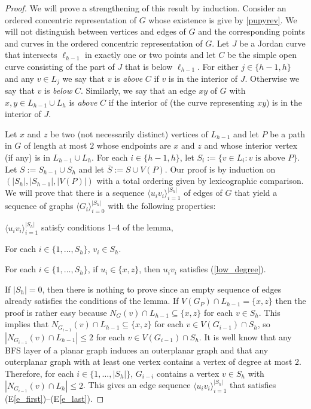 \documentclass{patmorin}
\begin{document}
\begin{proof}
  We will prove a strengthening of this result by induction.  Consider an ordered concentric representation of $G$ whose existence is give by \cref{pupyrev}.  We will not distinguish between vertices and edges of $G$ and the corresponding points and curves in the ordered concentric representation of $G$. Let $J$ be a Jordan curve that intersects $\ell_{h-1}$ in exactly one or two points and let $C$ be the simple open curve consisting of the part of $J$ that is below $\ell_{h-1}$.  For either $j\in\{h-1,h\}$ and any $v\in L_j$ we say that $v$ is \emph{above} $C$ if $v$ is in the interior of $J$. Otherwise we say that $v$ is \emph{below} $C$.  Similarly, we say that an edge $xy$ of $G$ with $x,y\in L_{h-1}\cup L_h$ is \emph{above} $C$ if the interior of (the curve representing $xy$) is in the interior of $J$.

  Let $x$ and $z$ be two (not necessarily distinct) vertices of $L_{h-1}$ and let $P$ be a path in $G$ of length at most $2$ whose endpoints are $x$ and $z$ and whose interior vertex (if any) is in $L_{h-1}\cup L_h$. For each $i\in\{h-1,h\}$, let $S_i:=\{v\in L_i:\mbox{$v$ is above $P$}\}$.  Let $S:=S_{h-1}\cup S_{h}$ and let $\overline{S}:=S\cup V(P)$. Our proof is by induction on $(|S_h|,|S_{h-1}|,|V(P)|)$ with a total ordering given by lexicographic comparison.   We will prove that there is a sequence $\langle u_iv_i\rangle_{i=1}^{|S_h|}$ of edges of $G$ that yield a sequence of graphs $\langle G_i\rangle_{i=0}^{|S_h|}$ with the following properties:
  \begin{compactenum}[(E1)]
    \item \label{e_first}\label{original_conditions} $\langle u_iv_i\rangle_{i=1}^{|S_h|}$ satisfy conditions 1--4 of the lemma,
    \item For each $i\in\{1,\ldots,S_h\}$, $v_i\in S_h$.
    \item \label{e_last} For each $i\in\{1,\ldots,S_h\}$, if $u_i\in\{x,z\}$, then $u_iv_i$ satisfies (\ref{low_degree}).
  \end{compactenum}


  If $|S_h|=0$, then there is nothing to prove since an empty sequence of edges already satisfies the conditions of the lemma.  If $V(G_P)\cap L_{h-1}=\{x,z\}$ then the proof is rather easy because $N_G(v)\cap L_{h-1}\subseteq \{x,z\}$ for each $v\in S_h$.  This implies that $N_{G_{i-1}}(v)\cap L_{h-1}\subseteq\{x,z\}$ for each $v\in V(G_{i-1})\cap S_h$, so $|N_{G_{i-1}}(v)\cap L_{h-1}|\le 2$ for each $v\in V(G_{i-1})\cap S_h$.  It is well know that any BFS layer of a planar graph induces an outerplanar graph and that any outerplanar graph with at least one vertex contains a vertex of degree at most $2$.  Therefore, for each $i\in\{1,\ldots,|S_h|\}$, $G_{i-i}$ contains a vertex $v\in S_h$ with $|N_{G_{i-1}}(v)\cap L_h|\le 2$.  This gives an edge sequence $\langle u_iv_i\rangle_{i=1}^{|S_h|}$ that satisfies (E\ref{e_first})--(E\ref{e_last}).


\end{proof}
\end{document}
